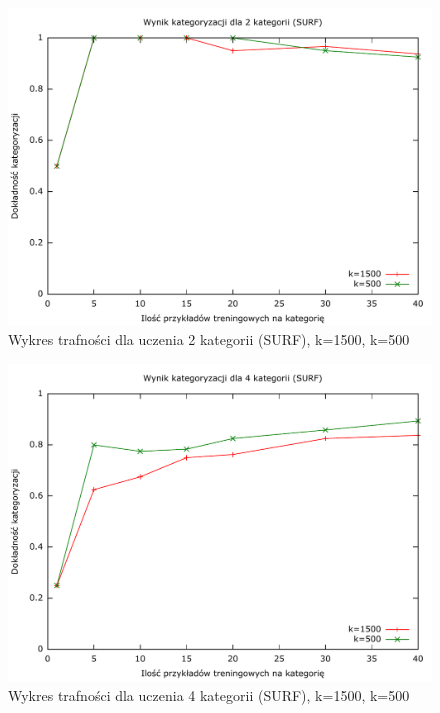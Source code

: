 \begin{figure}[h]
	\centering
	\includegraphics[scale=0.8]{graphics/04_interpretacja_wynikow/result-surf-2-1500-500.pdf}
	\caption{ Wykres trafności dla uczenia 2 kategorii (SURF), k=1500, k=500 }
	\label{fig:result-surf-2-1500-500}
\end{figure}

\begin{figure}[h]
	\centering
	\includegraphics[scale=0.8]{graphics/04_interpretacja_wynikow/result-surf-4-1500-500.pdf}
	\caption{ Wykres trafności dla uczenia 4 kategorii (SURF), k=1500, k=500 }
	\label{fig:result-surf-4-1500-500}
\end{figure}

